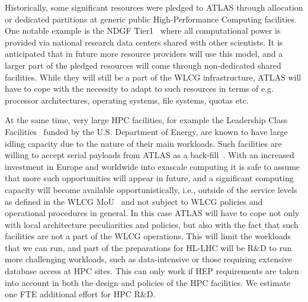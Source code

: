 Historically, some significant resources were pledged to ATLAS through allocation or dedicated partitions at generic public High-Performance Computing facilities. One notable example is the NDGF Tier1~\cite{ndgf} where all computational power is provided via national research data centers shared with other scientists. It is anticipated that in future more resource providers will use this model, and a larger part of the pledged resources will come through non-dedicated shared facilities. While they will still be a part of the WLCG infrastructure, ATLAS will have to cope with the necessity to adapt to such resources in terms of e.g. processor architectures, operating systems, file systems, quotas etc.

At the same time, very large HPC facilities, for example the Leadership Class Facilities~\cite{leadership} funded by the U.S. Department of Energy, are known to have large idling capacity due to the nature of their main workloads. Such facilities are willing to accept serial payloads from ATLAS as a back-fill~\cite{backfill}. With an increased investment in Europe and worldwide into exascale computing it is safe to assume that more such opportunities will appear in future, and a significant computing capacity will become available opportunistically, i.e., outside of the service levels as defined in the WLCG MoU~\cite{wlcg-mou} and not subject to WLCG policies and operational procedures in general. In this case ATLAS will have to cope not only with local architecture peculiarities and policies, but also with the fact that such facilities are not a part of the WLCG operations. This will limit the workloads that we can run, and part of the preparations for HL-LHC will be R\&D to run more challenging workloads, such as data-intensive or those requiring extensive database access at HPC sites. This can only work if HEP requirements are taken into account in both the design and policies of the HPC facilities. We estimate one FTE additional effort for HPC R\&D.



